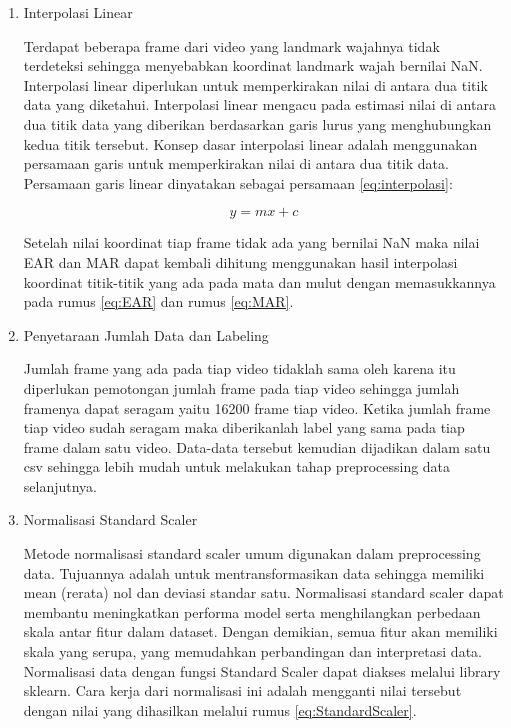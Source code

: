 \begin{enumerate}[nolistsep]
      \item Interpolasi Linear

            Terdapat beberapa frame dari video yang landmark wajahnya
            tidak terdeteksi sehingga menyebabkan koordinat landmark wajah bernilai NaN.
            Interpolasi linear diperlukan untuk memperkirakan nilai di antara dua titik data yang diketahui.
            Interpolasi linear mengacu pada estimasi nilai di antara dua titik data yang diberikan
            berdasarkan garis lurus yang menghubungkan kedua titik tersebut. Konsep dasar interpolasi
            linear adalah menggunakan persamaan garis untuk memperkirakan nilai di antara dua titik data.
            Persamaan garis linear dinyatakan sebagai persamaan \ref{eq:interpolasi}:

            \begin{equation}
                  \label{eq:interpolasi}
                  y = mx + c
            \end{equation}

            Setelah nilai koordinat tiap frame tidak ada yang bernilai NaN maka nilai EAR dan MAR dapat kembali dihitung
            menggunakan hasil interpolasi koordinat titik-titik yang ada pada mata dan mulut dengan memasukkannya
            pada rumus \ref{eq:EAR} dan rumus \ref{eq:MAR}.

      \item Penyetaraan Jumlah Data dan Labeling

            Jumlah frame yang ada pada tiap video tidaklah sama oleh karena itu diperlukan pemotongan jumlah frame pada tiap video
            sehingga jumlah framenya dapat seragam yaitu 16200 frame tiap video. Ketika jumlah frame tiap video sudah seragam maka
            diberikanlah label yang sama pada tiap frame dalam satu video. Data-data tersebut kemudian dijadikan dalam satu csv
            sehingga lebih mudah untuk melakukan tahap preprocessing data selanjutnya.

      \item Normalisasi Standard Scaler

            Metode normalisasi standard scaler umum digunakan dalam preprocessing data. Tujuannya adalah untuk
            mentransformasikan data sehingga memiliki mean (rerata) nol dan deviasi standar satu. Normalisasi standard
            scaler dapat membantu meningkatkan performa model serta menghilangkan perbedaan skala antar fitur dalam dataset.
            Dengan demikian, semua fitur akan memiliki skala yang serupa, yang memudahkan perbandingan dan interpretasi data.
            Normalisasi data dengan fungsi Standard Scaler dapat diakses melalui library sklearn. Cara kerja dari normalisasi
            ini adalah mengganti nilai tersebut dengan nilai yang dihasilkan melalui rumus \ref{eq:StandardScaler}.


\end{enumerate}
